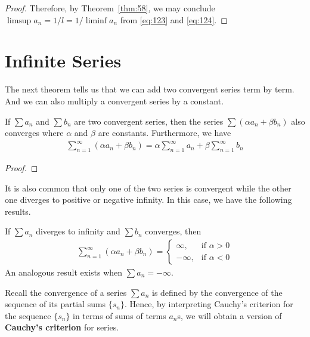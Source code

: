 \documentclass[thmcnt=section, 12pt]{my-elegantbook}
\begin{document}
\begin{proof}
    Therefore, by Theorem~\ref{thm:58}, we may conclude $\limsup a_n = 1 / l = 1 / \liminf a_n$ from \eqref{eq:123} and \eqref{eq:124}.
\end{proof}


\section{Infinite Series}


The next theorem tells us that we can add two convergent series term by term. And we can also multiply a convergent series by a constant.

\begin{theorem} \label{thm:48}
    If $\sum a_n$ and $\sum b_n$ are two convergent series,
    then the series $\sum (\alpha a_n + \beta b_n)$ also converges
    where $\alpha$ and $\beta$ are constants.
    Furthermore, we have
    \begin{align*}
        \sum_{n=1}^\infty (\alpha a_n + \beta b_n)
        = \alpha \sum_{n=1}^\infty a_n
        + \beta \sum_{n=1}^\infty b_n
    \end{align*}
\end{theorem}

\begin{proof}
\end{proof}

It is also common that
only one of the two series
is convergent while the other one diverges to
positive or negative infinity.
In this case, we have the following results.

\begin{theorem} \label{thm:72}
    If $\sum a_n$ diverges to infinity
    and $\sum b_n$ converges,
    then
    \begin{align*}
        \sum_{n=1}^\infty (\alpha a_n + \beta b_n)
        = \begin{cases}
              \infty,
               & \text{if $\alpha > 0$} \\
              -\infty,
               & \text{if $\alpha < 0$}
          \end{cases}
    \end{align*}
    An analogous result exists when $\sum a_n = -\infty$.
\end{theorem}


Recall the convergence of a series $\sum a_n$ is defined by the convergence of the sequence of its partial sums $\{s_n\}$. Hence, by interpreting Cauchy's criterion for the sequence $\{s_n\}$ in terms of sums of terms $a_n$s, we will obtain a version of \textbf{Cauchy's criterion} for series.
\end{document}

